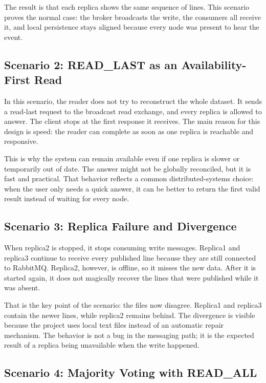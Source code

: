 \documentclass[11pt]{article}
\begin{document}
The result is that each replica shows the same sequence of lines. This scenario proves the normal case: the broker broadcasts the write, the consumers all receive it, and local persistence stays aligned because every node was present to hear the event.

\subsection{Scenario 2: READ\_LAST as an Availability-First Read}

In this scenario, the reader does not try to reconstruct the whole dataset. It sends a read-last request to the broadcast read exchange, and every replica is allowed to answer. The client stops at the first response it receives. The main reason for this design is speed: the reader can complete as soon as one replica is reachable and responsive.

This is why the system can remain available even if one replica is slower or temporarily out of date. The answer might not be globally reconciled, but it is fast and practical. That behavior reflects a common distributed-systems choice: when the user only needs a quick answer, it can be better to return the first valid result instead of waiting for every node.

\subsection{Scenario 3: Replica Failure and Divergence}

When replica2 is stopped, it stops consuming write messages. Replica1 and replica3 continue to receive every published line because they are still connected to RabbitMQ. Replica2, however, is offline, so it misses the new data. After it is started again, it does not magically recover the lines that were published while it was absent.

That is the key point of the scenario: the files now disagree. Replica1 and replica3 contain the newer lines, while replica2 remains behind. The divergence is visible because the project uses local text files instead of an automatic repair mechanism. The behavior is not a bug in the messaging path; it is the expected result of a replica being unavailable when the write happened.

\subsection{Scenario 4: Majority Voting with READ\_ALL}
\end{document}

